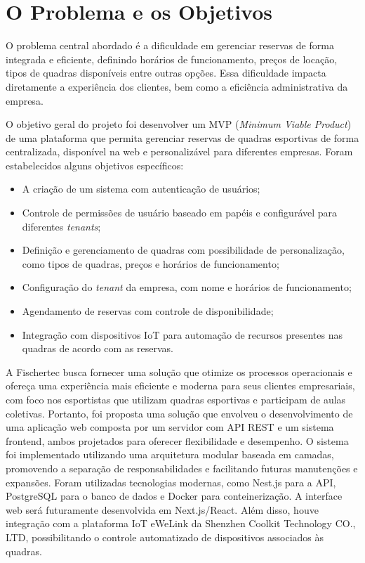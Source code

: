\section{O Problema e os Objetivos}

O problema central abordado é a dificuldade em gerenciar reservas de forma integrada e eficiente, definindo horários de funcionamento, preços de locação, tipos de quadras disponíveis entre outras opções. Essa dificuldade impacta diretamente a experiência dos clientes, bem como a eficiência administrativa da empresa.

O objetivo geral do projeto foi desenvolver um MVP (\textit{Minimum Viable Product}) de uma plataforma que permita gerenciar reservas de quadras esportivas de forma centralizada, disponível na web e personalizável para diferentes empresas. Foram estabelecidos alguns objetivos específicos:

\begin{itemize}
    \item A criação de um sistema com autenticação de usuários;
    \item Controle de permissões de usuário baseado em papéis e configurável para diferentes \textit{tenants};
    \item Definição e gerenciamento de quadras com possibilidade de personalização, como tipos de quadras, preços e horários de funcionamento;
    \item Configuração do \textit{tenant} da empresa, com nome e horários de funcionamento;
    \item Agendamento de reservas com controle de disponibilidade;
    \item Integração com dispositivos IoT para automação de recursos presentes nas quadras de acordo com as reservas.
\end{itemize}

A Fischertec busca fornecer uma solução que otimize os processos operacionais e ofereça uma experiência mais eficiente e moderna para seus clientes empresariais, com foco nos esportistas que utilizam quadras esportivas e participam de aulas coletivas. Portanto, foi proposta uma solução que envolveu o desenvolvimento de uma aplicação web composta por um servidor com API REST e um sistema frontend, ambos projetados para oferecer flexibilidade e desempenho. O sistema foi implementado utilizando uma arquitetura modular baseada em camadas, promovendo a separação de responsabilidades e facilitando futuras manutenções e expansões. Foram utilizadas tecnologias modernas, como Nest.js para a API, PostgreSQL para o banco de dados e Docker para conteinerização. A interface web será futuramente desenvolvida em Next.js/React. Além disso, houve integração com a plataforma IoT eWeLink da Shenzhen Coolkit Technology CO., LTD, possibilitando o controle automatizado de dispositivos associados às quadras.


